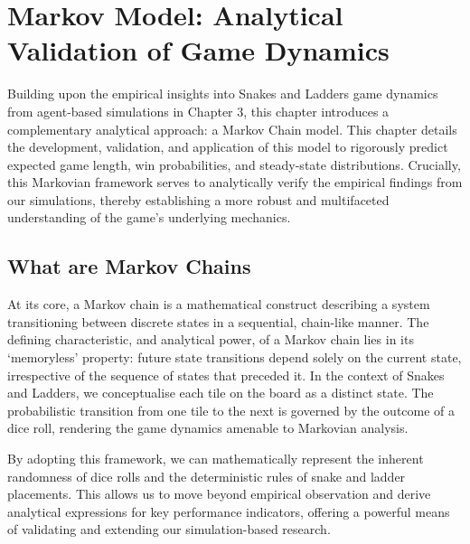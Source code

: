 \chapter{Markov Model: Analytical Validation of Game Dynamics}
Building upon the empirical insights into Snakes and Ladders game dynamics from agent-based simulations in Chapter 3, this chapter introduces a complementary analytical approach: a Markov Chain model. This chapter details the development, validation, and application of this model to rigorously predict expected game length, win probabilities, and steady-state distributions. Crucially, this Markovian framework serves to analytically verify the empirical findings from our simulations, thereby establishing a more robust and multifaceted understanding of the game's underlying mechanics.

\section{What are Markov Chains}
At its core, a Markov chain is a mathematical construct describing a system transitioning between discrete states in a sequential, chain-like manner. The defining characteristic, and analytical power, of a Markov chain lies in its ‘memoryless’ property: future state transitions depend solely on the current state, irrespective of the sequence of states that preceded it. In the context of Snakes and Ladders, we conceptualise each tile on the board as a distinct state. The probabilistic transition from one tile to the next is governed by the outcome of a dice roll, rendering the game dynamics amenable to Markovian analysis.

By adopting this framework, we can mathematically represent the inherent randomness of dice rolls and the deterministic rules of snake and ladder placements. This allows us to move beyond empirical observation and derive analytical expressions for key performance indicators, offering a powerful means of validating and extending our simulation-based research.


